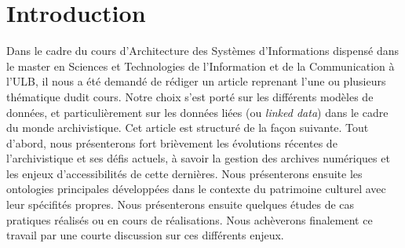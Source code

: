 \documentclass[12pt]{report}
\begin{document}
\section{Introduction}
Dans le cadre du cours d'Architecture des Systèmes d'Informations dispensé dans le master en Sciences et Technologies de l'Information et de la Communication à l'ULB, il nous a été demandé de rédiger un article reprenant l'une ou plusieurs thématique dudit cours. Notre choix s'est porté sur les différents modèles de données, et particulièrement sur les données liées (ou \textit{linked data}) dans le cadre du monde archivistique. Cet article est structuré de la façon suivante. Tout d'abord, nous présenterons fort brièvement les évolutions récentes de l'archivistique et ses défis actuels, à savoir la gestion des archives numériques et les enjeux d'accessibilités de cette dernières. Nous présenterons ensuite les ontologies principales développées dans le contexte du patrimoine culturel avec leur spécifités propres. Nous présenterons ensuite quelques études de cas pratiques réalisés ou en cours de réalisations. Nous achèverons finalement ce travail par une courte discussion sur ces différents enjeux. 
\end{document}
